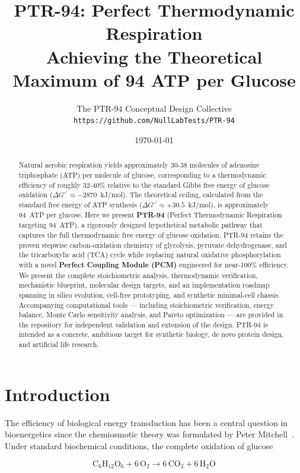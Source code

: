 \documentclass[12pt]{article}
\title{\textbf{PTR-94: Perfect Thermodynamic Respiration \\ Achieving the Theoretical Maximum of 94 ATP per Glucose}}
\author{
  The PTR-94 Conceptual Design Collective \\
  \texttt{https://github.com/NullLabTests/PTR-94}
}
\date{\today}
\begin{document}
\maketitle

\begin{abstract}
Natural aerobic respiration yields approximately 30-38 molecules of adenosine triphosphate (ATP) per molecule of glucose, corresponding to a thermodynamic efficiency of roughly 32-40\% relative to the standard Gibbs free energy of glucose oxidation ($\Delta G^{\circ\prime} \approx -2870$~kJ/mol). The theoretical ceiling, calculated from the standard free energy of ATP synthesis ($\Delta G^{\circ\prime} \approx +30.5$~kJ/mol), is approximately 94~ATP per glucose. Here we present \textbf{PTR-94} (Perfect Thermodynamic Respiration targeting 94~ATP), a rigorously designed hypothetical metabolic pathway that captures the full thermodynamic free energy of glucose oxidation. PTR-94 retains the proven stepwise carbon-oxidation chemistry of glycolysis, pyruvate dehydrogenase, and the tricarboxylic acid (TCA) cycle while replacing natural oxidative phosphorylation with a novel \textbf{Perfect Coupling Module (PCM)} engineered for near-100\% efficiency. We present the complete stoichiometric analysis, thermodynamic verification, mechanistic blueprint, molecular design targets, and an implementation roadmap spanning in silico evolution, cell-free prototyping, and synthetic minimal-cell chassis. Accompanying computational tools — including stoichiometric verification, energy balance, Monte Carlo sensitivity analysis, and Pareto optimization — are provided in the repository for independent validation and extension of the design. PTR-94 is intended as a concrete, ambitious target for synthetic biology, de novo protein design, and artificial life research.
\end{abstract}

\section{Introduction}

The efficiency of biological energy transduction has been a central question in bioenergetics since the chemiosmotic theory was formulated by Peter Mitchell~\cite{mitchell1961coupling}. Under standard biochemical conditions, the complete oxidation of glucose

\begin{equation}
\mathrm{C_6H_{12}O_6 + 6\,O_2 \longrightarrow 6\,CO_2 + 6\,H_2O}
\label{eq:glucose_oxidation}
\end{equation}
\end{document}
